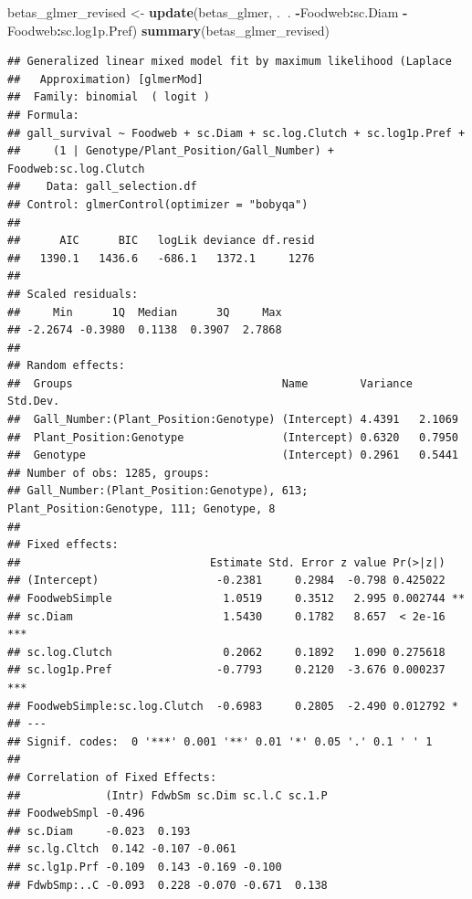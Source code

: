 \documentclass[]{elsarticle} %
\newenvironment{Shaded}{\begin{snugshade}}{\end{snugshade}}
\newcommand{\KeywordTok}[1]{\textcolor[rgb]{0.13,0.29,0.53}{\textbf{#1}}}
\newcommand{\StringTok}[1]{\textcolor[rgb]{0.31,0.60,0.02}{#1}}
\newcommand{\OperatorTok}[1]{\textcolor[rgb]{0.81,0.36,0.00}{\textbf{#1}}}
\newcommand{\NormalTok}[1]{#1}
\begin{document}
\begin{Shaded}
\begin{Highlighting}[]
\NormalTok{betas_glmer_revised <-}\StringTok{ }\KeywordTok{update}\NormalTok{(betas_glmer, .}\OperatorTok{~}\NormalTok{. }\OperatorTok{-}\NormalTok{Foodweb}\OperatorTok{:}\NormalTok{sc.Diam }\OperatorTok{-}\NormalTok{Foodweb}\OperatorTok{:}\NormalTok{sc.log1p.Pref)}
\KeywordTok{summary}\NormalTok{(betas_glmer_revised)}
\end{Highlighting}
\end{Shaded}

\begin{verbatim}
## Generalized linear mixed model fit by maximum likelihood (Laplace
##   Approximation) [glmerMod]
##  Family: binomial  ( logit )
## Formula: 
## gall_survival ~ Foodweb + sc.Diam + sc.log.Clutch + sc.log1p.Pref +  
##     (1 | Genotype/Plant_Position/Gall_Number) + Foodweb:sc.log.Clutch
##    Data: gall_selection.df
## Control: glmerControl(optimizer = "bobyqa")
## 
##      AIC      BIC   logLik deviance df.resid 
##   1390.1   1436.6   -686.1   1372.1     1276 
## 
## Scaled residuals: 
##     Min      1Q  Median      3Q     Max 
## -2.2674 -0.3980  0.1138  0.3907  2.7868 
## 
## Random effects:
##  Groups                                Name        Variance Std.Dev.
##  Gall_Number:(Plant_Position:Genotype) (Intercept) 4.4391   2.1069  
##  Plant_Position:Genotype               (Intercept) 0.6320   0.7950  
##  Genotype                              (Intercept) 0.2961   0.5441  
## Number of obs: 1285, groups:  
## Gall_Number:(Plant_Position:Genotype), 613; Plant_Position:Genotype, 111; Genotype, 8
## 
## Fixed effects:
##                             Estimate Std. Error z value Pr(>|z|)    
## (Intercept)                  -0.2381     0.2984  -0.798 0.425022    
## FoodwebSimple                 1.0519     0.3512   2.995 0.002744 ** 
## sc.Diam                       1.5430     0.1782   8.657  < 2e-16 ***
## sc.log.Clutch                 0.2062     0.1892   1.090 0.275618    
## sc.log1p.Pref                -0.7793     0.2120  -3.676 0.000237 ***
## FoodwebSimple:sc.log.Clutch  -0.6983     0.2805  -2.490 0.012792 *  
## ---
## Signif. codes:  0 '***' 0.001 '**' 0.01 '*' 0.05 '.' 0.1 ' ' 1
## 
## Correlation of Fixed Effects:
##             (Intr) FdwbSm sc.Dim sc.l.C sc.1.P
## FoodwebSmpl -0.496                            
## sc.Diam     -0.023  0.193                     
## sc.lg.Cltch  0.142 -0.107 -0.061              
## sc.lg1p.Prf -0.109  0.143 -0.169 -0.100       
## FdwbSmp:..C -0.093  0.228 -0.070 -0.671  0.138
\end{verbatim}
\end{document}
